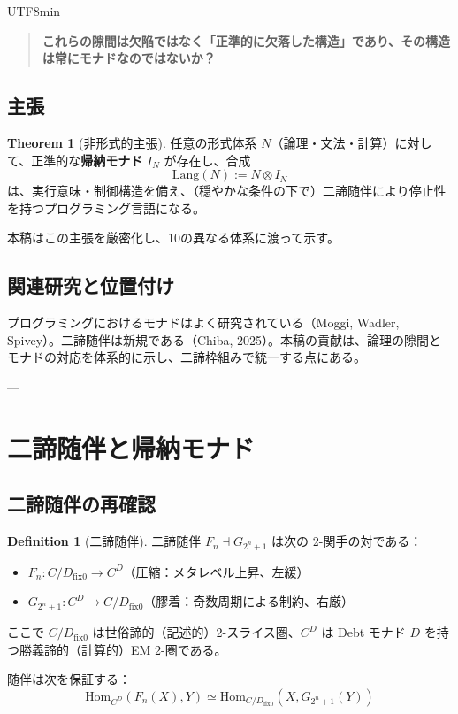 \documentclass[a4paper,11pt]{article}
\renewcommand{\emph}[1]{\textbf{#1}}
\theoremstyle{definition}
\newtheorem{definition}{Definition}[section]
\newtheorem{theorem}{Theorem}[section]
\begin{document}
\begin{CJK}{UTF8}{min}
\begin{quote}
\emph{これらの隙間は欠陥ではなく「正準的に欠落した構造」であり、その構造は常にモナドなのではないか？}
\end{quote}

\subsection{主張}

\begin{theorem}[非形式的主張]
任意の形式体系 $N$（論理・文法・計算）に対して、正準的な\emph{帰納モナド} $I_N$ が存在し、合成
\[
  \text{Lang}(N) := N \otimes I_N
\]
は、実行意味・制御構造を備え、（穏やかな条件の下で）二諦随伴により停止性を持つプログラミング言語になる。
\end{theorem}

本稿はこの主張を厳密化し、10の異なる体系に渡って示す。

\subsection{関連研究と位置付け}

プログラミングにおけるモナドはよく研究されている（Moggi, Wadler, Spivey）。二諦随伴は新規である（Chiba, 2025）。本稿の貢献は、論理の隙間とモナドの対応を体系的に示し、二諦枠組みで統一する点にある。

---

\section{二諦随伴と帰納モナド}

\subsection{二諦随伴の再確認}

\begin{definition}[二諦随伴]
二諦随伴 $F_n \dashv G_{2^n+1}$ は次の 2-関手の対である：
\begin{itemize}
  \item $F_n : C/D_{\mathrm{fix}0} \to C^D$（圧縮：メタレベル上昇、左緩）
  \item $G_{2^n+1} : C^D \to C/D_{\mathrm{fix}0}$（膠着：奇数周期による制約、右厳）
\end{itemize}
ここで $C/D_{\mathrm{fix}0}$ は世俗諦的（記述的）2-スライス圏、$C^D$ は Debt モナド $D$ を持つ勝義諦的（計算的）EM 2-圏である。

随伴は次を保証する：
\[
  \text{Hom}_{C^D}(F_n(X), Y) \simeq \text{Hom}_{C/D_{\text{fix}0}}(X, G_{2^n+1}(Y))
\]
\end{definition}


\end{CJK}
\end{document}
